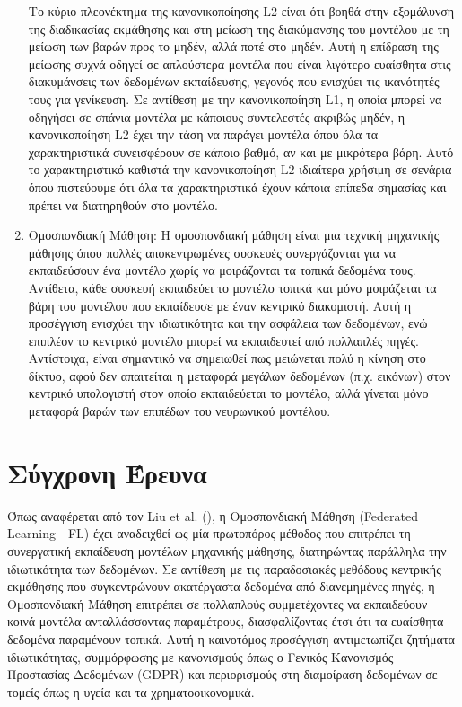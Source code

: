 \begin{enumerate}
    Το κύριο πλεονέκτημα της κανονικοποίησης L2 είναι ότι βοηθά στην εξομάλυνση της διαδικασίας εκμάθησης και στη μείωση της διακύμανσης του μοντέλου με τη μείωση των βαρών προς το μηδέν, αλλά ποτέ στο μηδέν. Αυτή η επίδραση της μείωσης συχνά οδηγεί σε απλούστερα μοντέλα που είναι λιγότερο ευαίσθητα στις διακυμάνσεις των δεδομένων εκπαίδευσης, γεγονός που ενισχύει τις ικανότητές τους για γενίκευση. Σε αντίθεση με την κανονικοποίηση L1, η οποία μπορεί να οδηγήσει σε σπάνια μοντέλα με κάποιους συντελεστές ακριβώς μηδέν, η κανονικοποίηση L2 έχει την τάση να παράγει μοντέλα όπου όλα τα χαρακτηριστικά συνεισφέρουν σε κάποιο βαθμό, αν και με μικρότερα βάρη. Αυτό το χαρακτηριστικό καθιστά την κανονικοποίηση L2 ιδιαίτερα χρήσιμη σε σενάρια όπου πιστεύουμε ότι όλα τα χαρακτηριστικά έχουν κάποια επίπεδα σημασίας και πρέπει να διατηρηθούν στο μοντέλο.

    \item Ομοσπονδιακή Μάθηση: Η ομοσπονδιακή μάθηση είναι μια τεχνική μηχανικής μάθησης όπου πολλές αποκεντρωμένες συσκευές συνεργάζονται για να εκπαιδεύσουν ένα μοντέλο χωρίς να μοιράζονται τα τοπικά δεδομένα τους. Αντίθετα, κάθε συσκευή εκπαιδεύει το μοντέλο τοπικά και μόνο μοιράζεται τα βάρη του μοντέλου που εκπαίδευσε με έναν κεντρικό διακομιστή. Αυτή η προσέγγιση ενισχύει την ιδιωτικότητα και την ασφάλεια των δεδομένων, ενώ επιπλέον το κεντρικό μοντέλο μπορεί να εκπαιδευτεί από πολλαπλές πηγές. Αντίστοιχα, είναι σημαντικό να σημειωθεί πως μειώνεται πολύ η κίνηση στο δίκτυο, αφού δεν απαιτείται η μεταφορά μεγάλων δεδομένων (π.χ. εικόνων) στον κεντρικό υπολογιστή στον οποίο εκπαιδεύεται το μοντέλο, αλλά γίνεται μόνο μεταφορά βαρών των επιπέδων του νευρωνικού μοντέλου. 

\end{enumerate}

\section{Σύγχρονη Έρευνα}

Όπως αναφέρεται από τον Liu et al. (\cite{liu2024recent}), η Ομοσπονδιακή Μάθηση (Federated Learning - FL) έχει αναδειχθεί ως μία πρωτοπόρος μέθοδος που επιτρέπει τη συνεργατική εκπαίδευση μοντέλων μηχανικής μάθησης, διατηρώντας παράλληλα την ιδιωτικότητα των δεδομένων. Σε αντίθεση με τις παραδοσιακές μεθόδους κεντρικής εκμάθησης που συγκεντρώνουν ακατέργαστα δεδομένα από διανεμημένες πηγές, η Ομοσπονδιακή Μάθηση επιτρέπει σε πολλαπλούς συμμετέχοντες να εκπαιδεύουν κοινά μοντέλα ανταλλάσσοντας παραμέτρους, διασφαλίζοντας έτσι ότι τα ευαίσθητα δεδομένα παραμένουν τοπικά. Αυτή η καινοτόμος προσέγγιση αντιμετωπίζει ζητήματα ιδιωτικότητας, συμμόρφωσης με κανονισμούς όπως ο Γενικός Κανονισμός Προστασίας Δεδομένων (GDPR) και περιορισμούς στη διαμοίραση δεδομένων σε τομείς όπως η υγεία και τα χρηματοοικονομικά.

